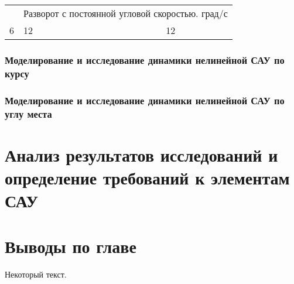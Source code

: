 \begin{table}[h]
\begin{tabular}{p{0.23in}p{0.99in}p{0.82in}p{0.62in}p{0.18in}p{0.62in}p{0.16in}p{0.49in}p{0.7in}}
		\multicolumn{1}{|p{0.23in}}{} & 
		\multicolumn{8}{|p{5.87in}|}{Разворот с постоянной угловой скоростью. град/с} \\
		\multicolumn{1}{|p{0.23in}}{6} & 
		\multicolumn{2}{|p{2.0in}}{12} & 
		\multicolumn{2}{|p{0.91in}}{} & 
		\multicolumn{2}{|p{0.98in}}{} & 
		\multicolumn{2}{|p{1.39in}|}{12} \\
		
		
	\end{tabular}
\end{table}

\subsubsection{Моделирование и исследование динамики нелинейной САУ по курсу} \label{subsec:ch4/sect6/sub1}


\subsubsection{Моделирование и исследование динамики нелинейной САУ по углу места} \label{subsec:ch4/sect6/sub2}


\section{Анализ результатов исследований и определение требований к элементам САУ} \label{ch:ch4/sect7}


\section{Выводы по главе} \label{ch:ch4/sect8}



Некоторый текст.

\clearpage